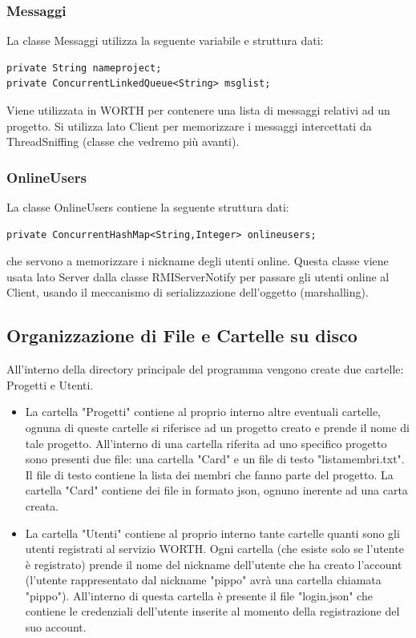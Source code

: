 \documentclass{article} %
\begin{document}
\subsubsection{Messaggi}
La classe Messaggi utilizza la seguente variabile e struttura dati: 
\begin{lstlisting}
private String nameproject;
private ConcurrentLinkedQueue<String> msglist;
\end{lstlisting}
Viene utilizzata in WORTH per contenere una lista di messaggi relativi ad un progetto. Si utilizza lato Client per memorizzare i messaggi intercettati da ThreadSniffing (classe che vedremo più avanti).
\subsubsection{OnlineUsers}
La classe OnlineUsers contiene la seguente struttura dati: 
\begin{lstlisting}
private ConcurrentHashMap<String,Integer> onlineusers;
\end{lstlisting}
che servono a memorizzare i nickname degli utenti online. Questa classe viene usata lato Server dalla classe RMIServerNotify per passare gli utenti online al Client, usando il meccanismo di serializzazione dell'oggetto (marshalling). 
\subsection{Organizzazione di File e Cartelle su disco}
All'interno della directory principale del programma vengono create due cartelle: Progetti e Utenti. 
\begin{itemize}
    \item La cartella "Progetti" contiene al proprio interno altre eventuali cartelle, ognuna di queste cartelle si riferisce ad un progetto creato e prende il nome di tale progetto. All'interno di una cartella riferita ad uno specifico progetto sono presenti due file: una cartella "Card" e un file di testo "listamembri.txt". Il file di testo contiene la lista dei membri che fanno parte del progetto. La cartella "Card" contiene dei file in formato json, ognuno inerente ad una carta creata.
    \item La cartella "Utenti" contiene al proprio interno tante cartelle quanti sono gli utenti registrati al servizio WORTH. Ogni cartella (che esiste solo se l'utente è registrato) prende il nome del nickname dell'utente che ha creato l'account (l'utente rappresentato dal nickname "pippo" avrà una cartella chiamata "pippo"). All'interno di questa cartella è presente il file "login.json" che contiene le credenziali dell'utente inserite al momento della registrazione del suo account. 
\end{itemize}
\end{document}
